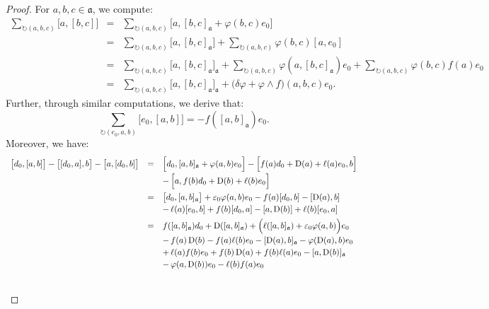 \documentclass[final,1p,times,nopreprintline]{elsarticle}
\theoremstyle{definition}
\numberwithin{equation}{section}
\newcommand{\ai}{\mathfrak{a}}
\numberwithin{equation}{section}
\newcommand{\D}{\operatorname{D}}
\begin{document}
\begin{proof}
	For $a,b,c\in\ai$, we compute:
	\begin{eqnarray*}
		\sum_{\circlearrowright (a,b,c)} \big[a,[b,c]\big]&=&\sum_{\circlearrowright (a,b,c)} \Big[a,[b,c]_\ai+\varphi(b,c)e_0\Big]\\
		&=&\sum_{\circlearrowright (a,b,c)} \big[a,[b,c]_\ai\big]+\sum_{\circlearrowright (a,b,c)} \varphi(b,c)[a,e_0]\\
		&=&\sum_{\circlearrowright (a,b,c)} \big[a,[b,c]_\ai\big]_\ai+\sum_{\circlearrowright (a,b,c)} \varphi(a,[b,c]_\ai)e_0+\sum_{\circlearrowright (a,b,c)}\varphi(b,c)f(a)e_0\\
		&=&\sum_{\circlearrowright (a,b,c)} \big[a,[b,c]_\ai\big]_\ai+\big(\delta\varphi+\varphi\wedge f\big)(a,b,c)e_0.
	\end{eqnarray*}
	Further, through similar computations, we derive that:
	\begin{equation*}
		\sum_{\circlearrowright (e_0,a,b)} \big[e_0,[a,b]\big]=-f([a,b]_\ai)e_0.
	\end{equation*}
	Moreover, we have:
	\begin{equation*}
		\begin{array}{r c l}\vspace{0.75mm}
		\big[d_0,[a,b]\big]-\big[[d_0,a],b\big]-\big[a,[d_0,b]\big]&=&\Big[d_0,[a,b]_\ai+\varphi(a,b)e_0\Big]-\Big[f(a)d_0+\D(a)+\ell(a)e_0,b\Big]\\\vspace{1.5mm}
		&&-\,\Big[a,f(b)d_0+\D(b)+\ell(b)e_0\Big]\\\vspace{0.75mm}
		&=&\big[d_0,[a,b]_\ai\big]+\varepsilon_0\varphi(a,b)e_0-f(a)[d_0,b]-[\D(a),b]\\\vspace{1.5mm}
		&&-\,\ell(a)[e_0,b]+f(b)[d_0,a]-[a,\D(b)]+\ell(b)[e_0,a]\\\vspace{0.75mm}
		&=&f([a,b]_\ai)d_0+\D([a,b]_\ai)+\Big(\ell([a,b]_\ai)+\varepsilon_0\varphi(a,b)\Big)e_0\\\vspace{0.75mm}
		&&-\,f(a)\D(b)-f(a)\ell(b)e_0-[\D(a),b]_\ai-\varphi(\D(a),b)e_0\\\vspace{0.75mm}
		&&+\,\ell(a)f(b)e_0+f(b)\D(a)+f(b)\ell(a)e_0-[a,\D(b)]_\ai\\\vspace{1.5mm}
		&&-\,\varphi(a,\D(b))e_0-\ell(b)f(a)e_0\\\vspace{0.75mm}

\end{array}
\end{equation*}
\end{proof}
\end{document}
